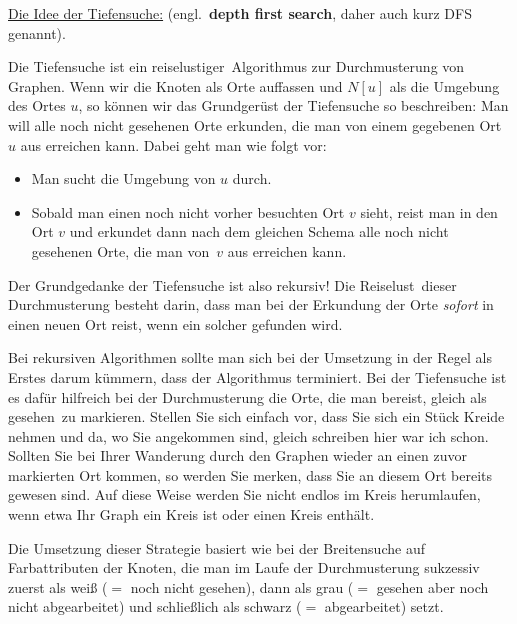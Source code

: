 \begin{bem} 
\underline{Die Idee der Tiefensuche:} (engl.~\textbf{depth first search}, daher auch kurz DFS genannt).

	Die Tiefensuche ist ein \glqq reiselustiger\grqq\ Algorithmus zur Durchmusterung von Graphen. Wenn wir die Knoten als Orte auffassen und $N[u]$ als die Umgebung des Ortes $u$, so können wir das Grundgerüst der Tiefensuche so beschreiben: Man will alle noch nicht gesehenen Orte erkunden, die man von einem gegebenen Ort $u$ aus erreichen kann. Dabei geht man wie folgt vor:
	\begin{itemize} 
			\item Man sucht die Umgebung von $u$ durch. 
			\item Sobald man einen noch nicht vorher besuchten Ort $v$ sieht, reist man in den Ort $v$ und erkundet dann nach dem gleichen Schema alle noch nicht gesehenen Orte, die man von~$v$ aus erreichen kann. 
	\end{itemize} 
	Der Grundgedanke der Tiefensuche ist also rekursiv!
	 Die \glqq Reiselust\grqq\ dieser Durchmusterung besteht darin, dass man bei der Erkundung der Orte \emph{sofort} in einen neuen Ort reist, wenn ein solcher gefunden wird.
	
	Bei rekursiven Algorithmen sollte man sich bei der Umsetzung in der Regel als Erstes darum kümmern, dass der Algorithmus terminiert. Bei der Tiefensuche ist es dafür hilfreich bei der Durchmusterung die Orte, die man bereist, gleich als \glqq gesehen\grqq\ zu markieren.  Stellen Sie sich einfach vor, dass Sie sich ein Stück Kreide nehmen und da, wo Sie angekommen sind, gleich schreiben \glqq hier war ich schon\grqq. Sollten Sie bei Ihrer Wanderung durch den Graphen wieder an einen zuvor markierten Ort kommen, so werden Sie merken, dass Sie an diesem Ort bereits gewesen sind. Auf diese Weise werden Sie nicht endlos im Kreis herumlaufen, wenn etwa Ihr Graph ein Kreis ist oder einen Kreis enthält. 
	
	Die Umsetzung dieser Strategie basiert wie bei der Breitensuche auf Farbattributen der Knoten, die man im Laufe der Durchmusterung sukzessiv zuerst als weiß ($=$ noch nicht gesehen), dann als  grau ($=$ gesehen aber noch nicht abgearbeitet) und schließlich als schwarz ($=$ abgearbeitet) setzt. 
\end{bem}


